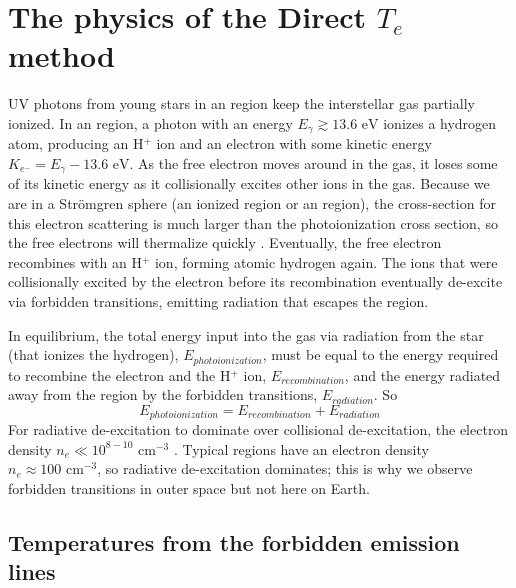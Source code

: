 \chapter[Direct method physics]{The physics of the Direct $T_e$ method}\label{sec:physics}

UV photons from young stars in an  region keep the interstellar gas 
partially ionized.  In an  region, a photon with an energy 
$E_\gamma \gtrsim 13.6\text{ eV}$ ionizes a hydrogen atom, producing an H$^+$ 
ion and an electron with some kinetic energy 
$K_{e^-} = E_\gamma - 13.6\text{ eV}$.  As the free electron moves around in the 
gas, it loses some of its kinetic energy as it collisionally excites other ions 
in the gas.  Because we are in a Str\"{o}mgren sphere (an ionized region or an 
 region), the cross-section for this electron scattering is much 
larger than the photoionization cross section, so the free electrons will 
thermalize quickly \citep{DeRobertis87}.  Eventually, the free electron 
recombines with an H$^+$ ion, forming atomic hydrogen again.  The ions that were 
collisionally excited by the electron before its recombination eventually 
de-excite via forbidden transitions, emitting radiation that escapes the 
 region.

In equilibrium, the total energy input into the gas via radiation from the star 
(that ionizes the hydrogen), $E_{photoionization}$, must be equal to the energy 
required to recombine the electron and the H$^+$ ion, $E_{recombination}$, and 
the energy radiated away from the  region by the forbidden 
transitions, $E_{radiation}$.  So
\begin{equation}
    E_{photoionization} = E_{recombination} + E_{radiation}
\end{equation}
For radiative de-excitation to dominate over collisional de-excitation, the 
electron density $n_e \ll 10^{8-10}\text{ cm}^{-3}$ \citep{DeRobertis87}.  
Typical  regions have an electron density 
$n_e \approx 100\text{ cm}^{-3}$, so radiative de-excitation dominates; this is 
why we observe forbidden transitions in outer space but not here on Earth.


\section[Estimating the temperature]{Temperatures from the forbidden emission lines}

